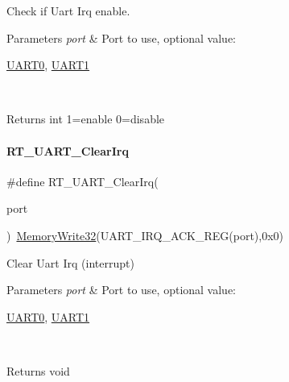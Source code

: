 Check if Uart Irq enable. 


\begin{DoxyParams}{Parameters}
{\em port} & Port to use, optional value\+:
\begin{DoxyCode}
\mbox{\hyperlink{a00173_a0508661f121639ffdee7de2353a0def2}{UART0}}, \mbox{\hyperlink{a00173_a8d69bf04d07af4fbbab5a8bd291f65ff}{UART1}}
\end{DoxyCode}
 \\
\hline
\end{DoxyParams}
\begin{DoxyReturn}{Returns}
int 1=enable 0=disable 
\end{DoxyReturn}
\mbox{\label{a00173_a84e87fc64f3149f1d5171ddca5719220}} 
\paragraph{\texorpdfstring{R\+T\+\_\+\+U\+A\+R\+T\+\_\+\+Clear\+Irq}{RT\_UART\_ClearIrq}}
{\footnotesize\ttfamily \#define R\+T\+\_\+\+U\+A\+R\+T\+\_\+\+Clear\+Irq(\begin{DoxyParamCaption}\item[{}]{port }\end{DoxyParamCaption})~\mbox{\hyperlink{a00068_a6b9732365b12e48ddb89fe1028b975b0}{Memory\+Write32}}(U\+A\+R\+T\+\_\+\+I\+R\+Q\+\_\+\+A\+C\+K\+\_\+\+R\+EG(port),0x0)}



Clear Uart Irq (interrupt) 


\begin{DoxyParams}{Parameters}
{\em port} & Port to use, optional value\+:
\begin{DoxyCode}
\mbox{\hyperlink{a00173_a0508661f121639ffdee7de2353a0def2}{UART0}}, \mbox{\hyperlink{a00173_a8d69bf04d07af4fbbab5a8bd291f65ff}{UART1}}
\end{DoxyCode}
 \\
\hline
\end{DoxyParams}
\begin{DoxyReturn}{Returns}
void 
\end{DoxyReturn}
\mbox{\label{a00173_aab59c28b31f6d93c8400c2af10cc0b05}} 
